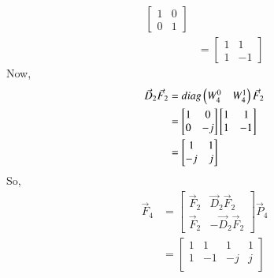 \documentclass[journal,12pt,twocolumn]{IEEEtran}
\renewcommand\thesection{\arabic{section}}
\begin{document}
\begin{enumerate}[label=\arabic*.,ref=\thesection.\theenumi]
\begin{align}
\begin{bmatrix}
                     1 & 0 \\
                     0 & 1
                \end{bmatrix}                                     \\
                          & =\begin{bmatrix}
                                  1 & 1  \\
                                  1 & -1
                             \end{bmatrix}
           \end{align}
           Now,
           \begin{align}
                \vec{D}_{2}\vec{F}_{2} & =diag\begin{pmatrix}W_{4}^{0} & W_{4}^{1}\end{pmatrix}\vec{F}_{2} \\
                                       & =\begin{bmatrix}
                                               1 & 0  \\
                                               0 & -j
                                          \end{bmatrix}
                \begin{bmatrix}
                     1 & 1  \\
                     1 & -1
                \end{bmatrix}                                                         \\
                                       & =\begin{bmatrix}
                                               1  & 1 \\
                                               -j & j
                                          \end{bmatrix}
           \end{align}
           So,
           \begin{align}
                \vec{F}_4 & =\begin{bmatrix}
                                  \vec{F}_{2} & \vec{D}_{2}\vec{F}_{2}  \\
                                  \vec{F}_{2} & -\vec{D}_{2}\vec{F}_{2}
                             \end{bmatrix}\vec{P}_4 \\
                          & =\begin{bmatrix}
                                  1 & 1  & 1  & 1  \\
                                  1 & -1 & -j & j  \\

\end{bmatrix}
\end{align}
\end{enumerate}
\end{document}
